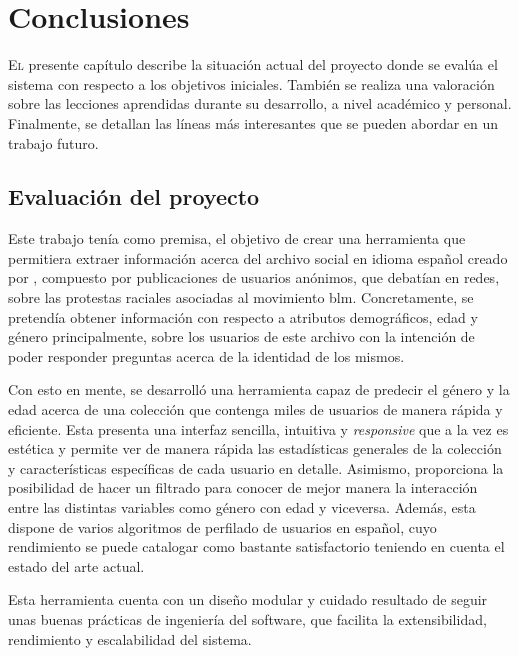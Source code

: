 \chapter{Conclusiones}
\label{chap:conclusiones}

\lettrine{E}{l} presente capítulo describe la situación actual del proyecto donde se evalúa el sistema con respecto a los objetivos iniciales. También se realiza una valoración sobre las lecciones aprendidas durante su desarrollo, a nivel académico y personal. Finalmente, se detallan las líneas más interesantes que se pueden abordar en un trabajo futuro.
\section{Evaluación del proyecto}
Este trabajo tenía como premisa, el objetivo de crear una herramienta que permitiera extraer información acerca del archivo social en idioma español creado por \citet{heritage_BLM}, compuesto por publicaciones de usuarios anónimos, que debatían en redes, sobre las protestas raciales asociadas al movimiento \acrshort{blm}. Concretamente, se pretendía obtener información con respecto a atributos demográficos, edad y género principalmente, sobre los usuarios de este archivo con la intención de poder responder preguntas acerca de la identidad de los mismos. 

Con esto en mente, se desarrolló una herramienta capaz de predecir el género y la edad acerca de una colección que contenga miles de usuarios de manera rápida y eficiente. Esta presenta una interfaz sencilla, intuitiva y \textit{responsive} que a la vez es estética y permite ver de manera rápida las estadísticas generales de la colección y características específicas de cada usuario en detalle. Asimismo, proporciona la posibilidad de hacer un filtrado para conocer de mejor manera la interacción entre las distintas variables como género con edad y viceversa. Además, esta dispone de varios algoritmos de perfilado de usuarios en español, cuyo rendimiento se puede catalogar como bastante satisfactorio teniendo en cuenta el estado del arte actual. 

Esta herramienta cuenta con un diseño modular y cuidado resultado de seguir unas buenas prácticas de ingeniería del software, que facilita la extensibilidad, rendimiento y escalabilidad del sistema.

